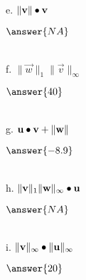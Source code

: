 \documentclass{ximera}
\begin{document}
\begin{exercise}
e. $\|\mathbf{v}\| \bullet \mathbf{v}$ \\

\begin{prompt}
$\answer{NA}$
\end{prompt} \\

f. $\|\vec{w}\|_{1} \|\vec{v}\|_{\infty}$ \\

\begin{prompt}
$\answer{40}$
\end{prompt} \\

g. $\mathbf{u} \bullet \mathbf{v} + \|\mathbf{w}\|$ \\

\begin{prompt}
$\answer{-8.9}$
\end{prompt} \\

h. $\|\mathbf{v}\|_{1} \|\mathbf{w}\|_{\infty} \bullet \mathbf{u}$\\

\begin{prompt}
$\answer{NA}$
\end{prompt} \\

i. $\|\mathbf{v}\|_{\infty} \bullet \|\mathbf{u}\|_{\infty}$\\

\begin{prompt}
$\answer{20}$
\end{prompt} 































\end{exercise}
\end{document}
